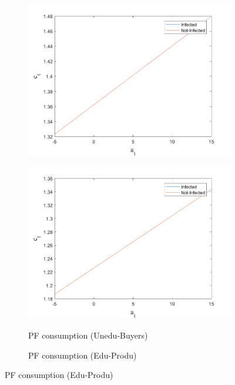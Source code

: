 \begin{figure}[H]
\begin{subfigure}{0.5\textwidth}
   \includegraphics[width=\linewidth,height = 0.22\textheight]{figures/pre/FIG5.png}
    \label{fig_dert}
\end{subfigure}
\hspace*{\fill}
\begin{subfigure}{0.5\textwidth}\caption{PF consumption (Unedu-Buyers)}
   \includegraphics[width=\linewidth,height = 0.22\textheight]{figures/pre/FIG6.png}
    \label{fig:x_b}
\end{subfigure}
\bigskip
\begin{subfigure}{0.5\textwidth}\caption{PF consumption (Edu-Produ)}

\end{subfigure}
\end{figure}
